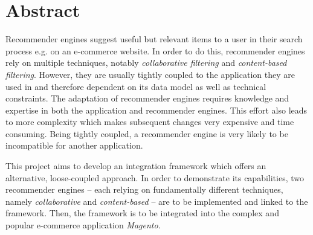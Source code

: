 \chapter*{Abstract}

Recommender engines suggest useful but relevant items to a user in their search process e.g. on an e-commerce website. In order to do this, recommender engines rely on multiple techniques, notably \emph{collaborative filtering} and \emph{content-based filtering}. However, they are usually tightly coupled to the application they are used in and therefore dependent on its data model as well as technical constraints. The adaptation of recommender engines requires knowledge and expertise in both the application and recommender engines. This effort also leads to more complexity which makes subsequent changes very expensive and time consuming. Being tightly coupled, a recommender engine is very likely to be incompatible for another application.

This project aims to develop an integration framework which offers an alternative, loose-coupled approach. In order to demonstrate its capabilities, two recommender engines -- each relying on fundamentally different techniques, namely \emph{collaborative} and \emph{content-based} -- are to be implemented and linked to the framework. Then, the framework is to be integrated into the complex and popular e-commerce application \emph{Magento}.